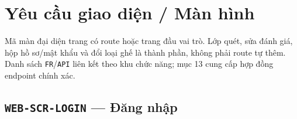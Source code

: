 \clearpage
\section{Yêu cầu giao diện /\allowbreak{} Màn hình}\label{sec:srs-12}
Mã màn đại diện trang có route hoặc trang đầu vai trò. Lớp quét, sửa đánh giá, hộp hồ sơ/\allowbreak{}mật khẩu và đổi loại ghế là thành phần, không phải route tự thêm. Danh sách \texttt{FR}/\allowbreak{}\texttt{API} liên kết theo khu chức năng; mục 13 cung cấp hợp đồng endpoint chính xác.

\subsection{\texttt{WEB-\allowbreak{}SCR-\allowbreak{}LOGIN} — Đăng nhập}
\begingroup
\fontsize{9.5}{12}\selectfont
\setlength{\SRSWidth}{\dimexpr\linewidth-2\tabcolsep\relax}
